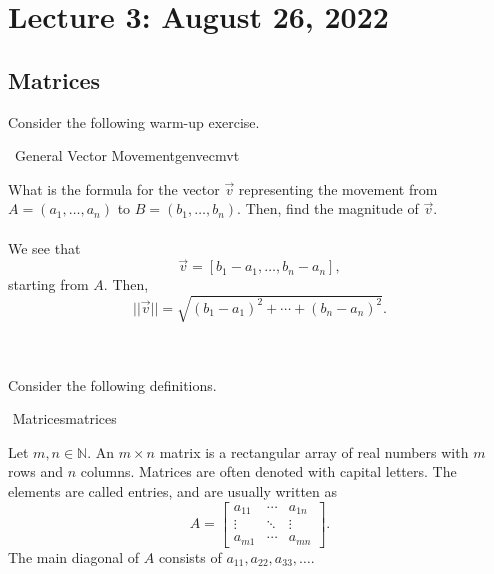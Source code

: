 \pagebreak

\section{Lecture 3: August 26, 2022}

    \subsection{Matrices}

        Consider the following warm-up exercise.
        \begin{example}{\Difficulty\,\Difficulty\,\,General Vector Movement}{genvecmvt}

            What is the formula for the vector \(\vec{v}\) representing the movement from \(A=(a_1,\ldots,a_n)\) to \(B=(b_1,\ldots,b_n)\). Then, find the magnitude of \(\vec{v}\).
            \\
            \\
            We see that
            \begin{equation*}
                \vec{v}=[b_1-a_1,\ldots,b_n-a_n],
            \end{equation*}
            starting from \(A\). Then,
            \begin{equation*}
                ||\vec{v}||=\sqrt{(b_1-a_1)^2+\cdots+(b_n-a_n)^2}.
            \end{equation*}
        
        \end{example}
        \vphantom
        \\
        \\
        Consider the following definitions.
        \begin{definition}{\Stop\,\,Matrices}{matrices}
        
            Let \(m,n\in\mathbb{N}\). An \(m\times n\) matrix is a rectangular array of real numbers with \(m\) rows and \(n\) columns. Matrices are often denoted with capital letters. The elements are called entries, and are usually written as
            \begin{equation*}
                A=\begin{bmatrix} a_{11} & \cdots & a_{1n} \\ \vdots & \ddots & \vdots \\ a_{m1} & \cdots & a_{mn} \end{bmatrix}.
            \end{equation*}
            The main diagonal of \(A\) consists of \(a_{11},a_{22},a_{33},\ldots\).
        
        \end{definition}
